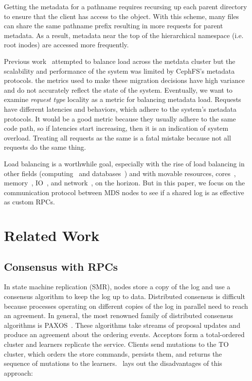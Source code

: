 \documentclass[conference]{acm_proc_article-sp} \usepackage[english]{babel}
\begin{document}
Getting the metadata for a pathname requires recursing up each parent directory
to ensure that the client has access to the object. With this scheme, many
files can share the same pathname prefix resulting in more requests for parent
metadata. As a result, metadata near the top of the hierarchical namespace
({i.e.} root inodes) are accessed more frequently. 


Previous work~\cite{sevilla:sc15-mantle} attempted to balance load across the
metdata cluster but the scalability and performance of the system was limited
by CephFS's metadata protocols. the metrics used to make these migration
decisions have high variance and do not accurately reflect the state of the
system. Eventually, we want to examine {\it request type} locality  as a metric
for balancing metadata load. Requests have different latencies and behaviors,
which adhere to the system's metadata protocols. It would be a good metric
because they usually adhere to the same code path, so if latencies start
increasing, then it is an indication of system overload. Treating all requests
as the same is a fatal mistake because not all requests do the same thing.

Load balancing is a worthwhile goal, especially with the rise of load balancing
in other fields (computing~\cite{zhang:journal2010-cloud-challenges} and
databases~\cite{elmore:sigmod2013-pythia}) and with movable resources,
cores~\cite{zhang:journal2010-cloud-challenges},
memory~\cite{chapman:atc2009-vnuma}, IO~\cite{raj:hpdc2007-io-virtualization},
and network~\cite{georgiadis:atn1996-network-qos}, on the horizon. But in this
paper, we focus on the communication protocol between MDS nodes to see if a
shared log is as effective as custom RPCs.

\section{Related Work} 

\subsection{Consensus with RPCs}

In state machine replication (SMR), nodes store a copy of the log and use a 
consensus algorithm to keep the log up to data. Distributed consensus is difficult
because processes operating on different copies of the log in parallel need to 
reach an agreement. In general, the most renowned family of distributed consensus algorithms is PAXOS~\cite{PAXOS}. These algorithms 
take streams of proposal updates and produce an agreement about the ordering 
events. Acceptors form a total-ordered cluster and learners 
replicate the service. Clients send mutations to the TO cluster, which orders 
the store commands, persists them, and returns the sequence of mutations to the
learners.~\cite{malkhi:sigops12-paxos} lays out the disadvantages of this approach:
\end{document}
